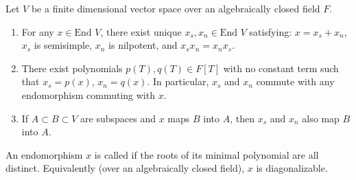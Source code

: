 Let $V$ be a finite dimensional vector space over an algebraically closed field $F$.

\begin{enumerate}
\item[(a)] For any $x \in \text{End } V$, there exist unique $x_s, x_n \in \text{End } V$ satisfying: $x = x_s + x_n$, $x_s$ is semisimple, $x_n$ is nilpotent, and $x_s x_n = x_n x_s$.
\item[(b)] There exist polynomials $p(T), q(T) \in F[T]$ with no constant term such that $x_s = p(x)$, $x_n = q(x)$. In particular, $x_s$ and $x_n$ commute with any endomorphism commuting with $x$.
\item[(c)] If $A \subset B \subset V$ are subspaces and $x$ maps $B$ into $A$, then $x_s$ and $x_n$ also map $B$ into $A$.
\end{enumerate}

An endomorphism $x$ is called  if the roots of its minimal polynomial are all distinct. Equivalently (over an algebraically closed field), $x$ is diagonalizable.
